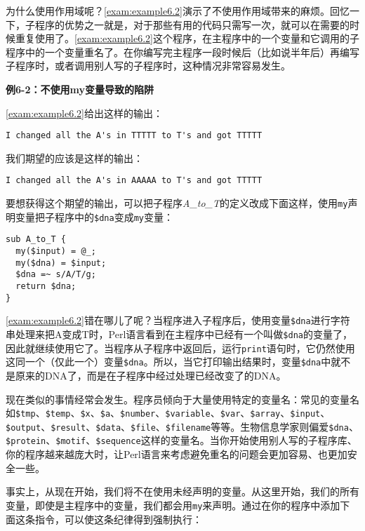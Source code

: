 为什么使用作用域呢？\autoref{exam:example6.2}演示了不使用作用域带来的麻烦。回忆一下，子程序的优势之一就是，对于那些有用的代码只需写一次，就可以在需要的时候重复使用了。\autoref{exam:example6.2}这个程序，在主程序中的一个变量和它调用的子程序中的一个变量重名了。在你编写完主程序一段时候后（比如说半年后）再编写子程序时，或者调用别人写的子程序时，这种情况非常容易发生。

\textbf{例6-2：不使用my变量导致的陷阱}


\autoref{exam:example6.2}给出这样的输出：

\begin{lstlisting}
I changed all the A's in TTTTT to T's and got TTTTT 
\end{lstlisting}

我们期望的应该是这样的输出：

\begin{lstlisting}
I changed all the A's in AAAAA to T's and got TTTTT 
\end{lstlisting}

要想获得这个期望的输出，可以把子程序\textit{A\_to\_T}的定义改成下面这样，使用\verb|my|声明变量把子程序中的\verb|$dna|变成\verb|my|变量：

\begin{lstlisting}
sub A_to_T {
  my($input) = @_;
  my($dna) = $input;
  $dna =~ s/A/T/g;
  return $dna;
}
\end{lstlisting}

\autoref{exam:example6.2}错在哪儿了呢？当程序进入子程序后，使用变量\verb|$dna|进行字符串处理来把A变成T时，Perl语言看到在主程序中已经有一个叫做\verb|$dna|的变量了，因此就继续使用它了。当程序从子程序中返回后，运行\verb|print|语句时，它仍然使用这同一个（仅此一个）变量\verb|$dna|。所以，当它打印输出结果时，变量\verb|$dna|中就不是原来的DNA了，而是在子程序中经过处理已经改变了的DNA。

现在类似的事情经常会发生。程序员倾向于大量使用特定的变量名：常见的变量名如\verb|$tmp|、\verb|$temp|、\verb|$x|、\verb|$a|、\verb|$number|、\verb|$variable|、\verb|$var|、\verb|$array|、\verb|$input|、\verb|$output|、\verb|$result|、\verb|$data|、\verb|$file|、\verb|$filename|等等。生物信息学家则偏爱\verb|$dna|、\verb|$protein|、\verb|$motif|、\verb|$sequence|这样的变量名。当你开始使用别人写的子程序库、你的程序越来越庞大时，让Perl语言来考虑避免重名的问题会更加容易、也更加安全一些。

事实上，从现在开始，我们将不在使用未经声明的变量。从这里开始，我们的所有变量，即使是主程序中的变量，我们都会用\verb|my|来声明。通过在你的程序中添加下面这条指令，可以使这条纪律得到强制执行：

